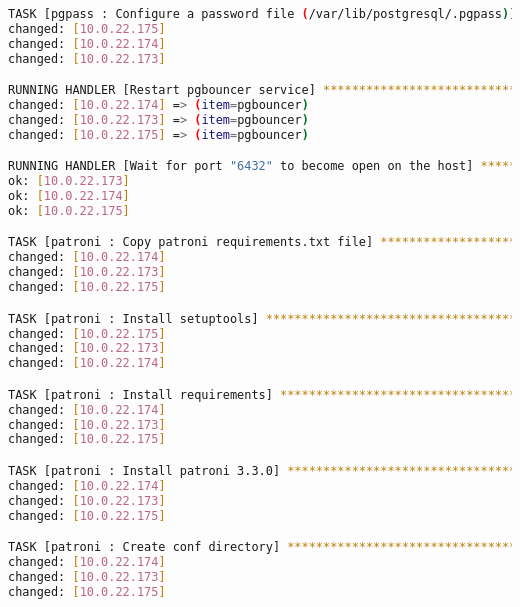 \begin{flushleft}
\begin{lstlisting}[language=bash, caption=Deploy - Anhang - Deployt,captionpos=b,label={lst:deploy-appendix-deployt},breaklines=true]
TASK [pgpass : Configure a password file (/var/lib/postgresql/.pgpass)] *******************************************************************************************************************************************
changed: [10.0.22.175]
changed: [10.0.22.174]
changed: [10.0.22.173]

RUNNING HANDLER [Restart pgbouncer service] ***********************************************************************************************************************************************************************
changed: [10.0.22.174] => (item=pgbouncer)
changed: [10.0.22.173] => (item=pgbouncer)
changed: [10.0.22.175] => (item=pgbouncer)

RUNNING HANDLER [Wait for port "6432" to become open on the host] *************************************************************************************************************************************************
ok: [10.0.22.173]
ok: [10.0.22.174]
ok: [10.0.22.175]

TASK [patroni : Copy patroni requirements.txt file] ***************************************************************************************************************************************************************
changed: [10.0.22.174]
changed: [10.0.22.173]
changed: [10.0.22.175]

TASK [patroni : Install setuptools] *******************************************************************************************************************************************************************************
changed: [10.0.22.175]
changed: [10.0.22.173]
changed: [10.0.22.174]

TASK [patroni : Install requirements] *****************************************************************************************************************************************************************************
changed: [10.0.22.174]
changed: [10.0.22.173]
changed: [10.0.22.175]

TASK [patroni : Install patroni 3.3.0] ****************************************************************************************************************************************************************************
changed: [10.0.22.174]
changed: [10.0.22.173]
changed: [10.0.22.175]

TASK [patroni : Create conf directory] ****************************************************************************************************************************************************************************
changed: [10.0.22.174]
changed: [10.0.22.173]
changed: [10.0.22.175]


\end{lstlisting}
\end{flushleft}
